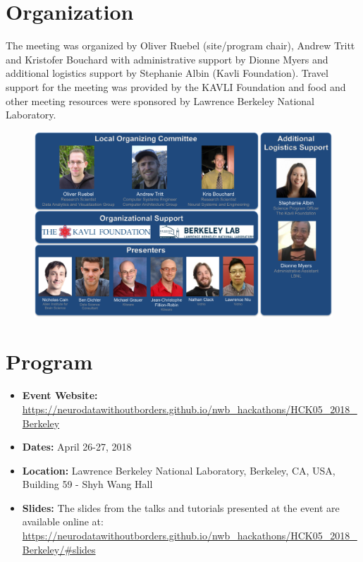 \documentclass{article}
\begin{document}
\section{Organization}

The meeting was organized by Oliver Ruebel (site/program chair), Andrew Tritt and Kristofer Bouchard with administrative support by Dionne Myers and additional logistics support by Stephanie Albin (Kavli Foundation). Travel support for the meeting was provided by the KAVLI Foundation and food and other meeting resources were sponsored by Lawrence Berkeley National Laboratory. 


\begin{figure}[h!]
\includegraphics[width=15.5cm]{nwb_hackathon_presenters.png}
\end{figure}

\clearpage

\section{Program}
\label{sec:program}

\begin{itemize}
  \item \textbf{Event Website:} \href{https://neurodatawithoutborders.github.io/nwb_hackathons/HCK05_2018_Berkeley}{https://neurodatawithoutborders.github.io/nwb\_hackathons/HCK05\_2018\_Berkeley}
  \item \textbf{Dates:} April 26-27, 2018
  \item \textbf{Location:} Lawrence Berkeley National Laboratory, Berkeley, CA, USA, Building 59 - Shyh Wang Hall %
  \item \textbf{Slides:} The slides from the talks and tutorials presented at the event are available online at: \\ \href{https://neurodatawithoutborders.github.io/nwb_hackathons/HCK05_2018_Berkeley/#slides}{https://neurodatawithoutborders.github.io/nwb\_hackathons/HCK05\_2018\_Berkeley/\#slides}
\end{itemize}
\end{document}
